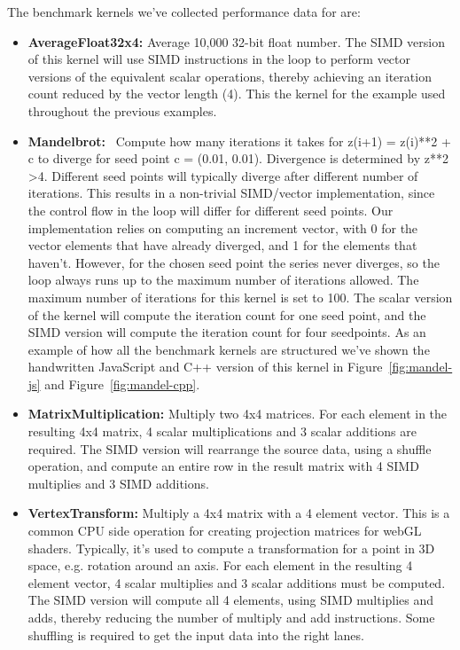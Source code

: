 \documentclass[preprint]{sigplanconf}
\begin{document}
The benchmark kernels we've collected performance data for are:

\begin{itemize}
\item
\textbf{AverageFloat32x4:} Average 10,000 32-bit float number.  The
SIMD version of this kernel will use SIMD instructions in the loop
to perform vector versions of the equivalent scalar operations, thereby
achieving an iteration count reduced by the vector length (4).
This the kernel for the example used throughout the previous examples.

\item
\textbf{Mandelbrot:}~\cite{mandelbrot} Compute how many iterations it takes for
z(i+1) = z(i)**2 + c to diverge for seed point c = (0.01, 0.01).
Divergence is determined by z**2 \textgreater 4.  Different seed points
will typically diverge after different number of iterations.  This results
in a non-trivial SIMD/vector implementation, since the control flow in the loop
will differ for different seed points.  Our implementation relies on computing an
increment vector, with 0 for the vector elements that have already diverged, and 1
for the elements that haven't.  However, for the chosen seed point the
series never diverges, so the loop always runs up to the maximum number of iterations allowed.  The
maximum number of iterations for this kernel is set to 100.  The scalar version
of the kernel will compute the iteration count for one seed point, and
the SIMD version will compute the iteration count for four seedpoints.
As an example of how all the benchmark kernels are structured we've shown
the handwritten JavaScript and C++ version of this kernel in Figure~\ref{fig:mandel-js}
and Figure~\ref{fig:mandel-cpp}.

\item
\textbf{MatrixMultiplication:} Multiply two 4x4 matrices.  For each element in
the resulting 4x4 matrix, 4 scalar multiplications and 3 scalar additions are
required.  The SIMD version will rearrange the source data, using a shuffle operation,
and compute an entire row in the result matrix with 4 SIMD multiplies and 3 SIMD additions.

\item
\textbf{VertexTransform:} Multiply a 4x4 matrix with a 4 element vector.  This
is a common CPU side operation for creating projection matrices for webGL shaders.
Typically, it's used to compute a transformation for a point in 3D space, e.g. rotation
around an axis.  For each element in the resulting 4 element vector, 4 scalar multiplies
and 3 scalar additions must be computed.  The SIMD version will compute all 4 elements,
using SIMD multiplies and adds, thereby reducing the number of multiply and add instructions.
Some shuffling is required to get the input data into the right lanes.


\end{itemize}
\end{document}

